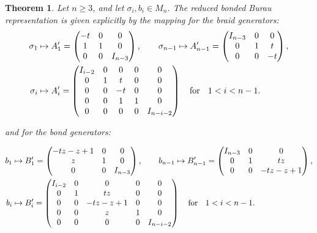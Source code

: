 \documentclass{article}
\theoremstyle{definition}
\theoremstyle{plain}
\newtheorem{theorem}{Theorem}[section]
\theoremstyle{remark}
\begin{document}
\begin{theorem}
Let $n \geq 3$, and let $\sigma_i, b_i \in M_n$. The reduced bonded Burau representation is given explicitly by the mapping
for the braid generators:
\begin{align}
\sigma_1 &
\mapsto A_1' =
\begin{pmatrix}
-t & 0 & 0 \\
1 & 1 & 0 \\
0 & 0 & I_{n-3}
\end{pmatrix}, \qquad
\sigma_{n-1}
\mapsto A_{n-1}' =
\begin{pmatrix}
I_{n-3} & 0 & 0 \\
0 & 1 & t \\
0 & 0 & -t
\end{pmatrix},
\notag
\\
\sigma_{i} & \mapsto 
A_i' =
\begin{pmatrix}
I_{i-2} & 0 & 0 & 0 & 0 \\
0 & 1 & t & 0 & 0 \\
0 & 0 & -t & 0 & 0 \\
0 & 0 & 1 & 1 & 0 \\
0 & 0 & 0 & 0 & I_{n-i-2}
\end{pmatrix}\quad \text{for \; $1 < i < n-1$}. \notag
\end{align} 

and for the bond generators:

\begin{align}
b_1 &
\mapsto B_1' =
\begin{pmatrix}
-tz - z + 1 & 0 & 0 \\
z & 1 & 0 \\
0 & 0 & I_{n-3}
\end{pmatrix}, \qquad
b_{n-1}
\mapsto B_{n-1}' =
\begin{pmatrix}
I_{n-3} & 0 & 0 \\
0 & 1 & tz \\
0 & 0 & -tz - z + 1
\end{pmatrix},
\notag
\\
b_{i} &\mapsto 
B_i' =
\begin{pmatrix}
I_{i-2} & 0 & 0 & 0 & 0 \\
0 & 1 & tz & 0 & 0 \\
0 & 0 & -tz - z + 1 & 0 & 0 \\
0 & 0 & z & 1 & 0 \\
0 & 0 & 0 & 0 & I_{n-i-2}
\end{pmatrix}\quad \text{for \; $1 < i < n-1$}. \notag
\end{align} 



\end{theorem}
\end{document}
